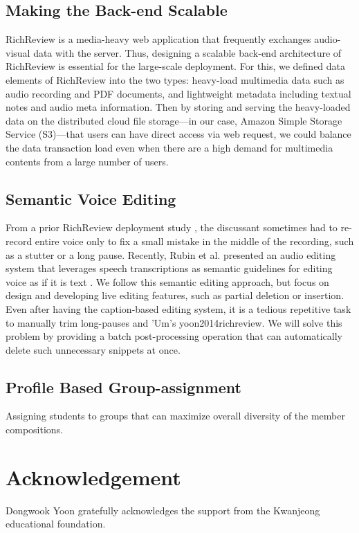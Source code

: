 \documentclass{sigchi}
\begin{document}
\subsection{Making the Back-end Scalable}
RichReview is a media-heavy web application that frequently exchanges audio-visual data with the server.
Thus, designing a scalable back-end architecture of RichReview is essential for the large-scale deployment.
For this, we defined data elements of RichReview into the two types: heavy-load multimedia data such as audio recording and PDF documents, and lightweight metadata including textual notes and audio meta information.
Then by storing and serving the heavy-loaded data on the distributed cloud file storage---in our case, Amazon Simple Storage Service (S3)---that users can have direct access via web request, we could balance the data transaction load even when there are a high demand for multimedia contents from a large number of users.

\subsection{Semantic Voice Editing}
From a prior RichReview deployment study \cite{yoon2015richreview}, the discussant sometimes had to re-record entire voice only to fix a small mistake in the middle of the recording, such as a stutter or a long pause.
Recently, Rubin et al. presented an audio editing system that leverages speech transcriptions as semantic guidelines for editing voice as if it is text \cite{rubin2013content}.
We follow this semantic editing approach, but focus on design and developing live editing features, such as partial deletion or insertion.
Even after having the caption-based editing system, it is a tedious repetitive task to manually trim long-pauses and 'Um's {yoon2014richreview}.
We will solve this problem by providing a batch post-processing operation that can automatically delete such unnecessary snippets at once.

\subsection{Profile Based Group-assignment}
Assigning students to groups that can maximize overall diversity of the member compositions.

\section{Acknowledgement} 
Dongwook Yoon gratefully acknowledges the support from the Kwanjeong educational foundation.




\end{document}
